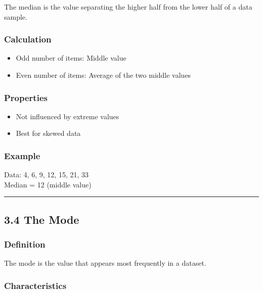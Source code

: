 \documentclass[
  letterpaper,
  DIV=11,
  numbers=noendperiod]{scrreprt}
\providecommand{\tightlist}{%
  \setlength{\itemsep}{0pt}\setlength{\parskip}{0pt}}
\begin{document}
The median is the value separating the higher half from the lower half
of a data sample.

\subsubsection{Calculation}\label{calculation}

\begin{itemize}
\tightlist
\item
  Odd number of items: Middle value
\item
  Even number of items: Average of the two middle values
\end{itemize}

\subsubsection{Properties}\label{properties}

\begin{itemize}
\tightlist
\item
  Not influenced by extreme values
\item
  Best for skewed data
\end{itemize}

\subsubsection{Example}\label{example-1}

Data: 4, 6, 9, 12, 15, 21, 33\\
Median = 12 (middle value)

\begin{center}\rule{0.5\linewidth}{0.5pt}\end{center}

\subsection{3.4 The Mode}\label{the-mode}

\subsubsection{Definition}\label{definition-2}

The mode is the value that appears most frequently in a dataset.

\subsubsection{Characteristics}\label{characteristics}
\end{document}
